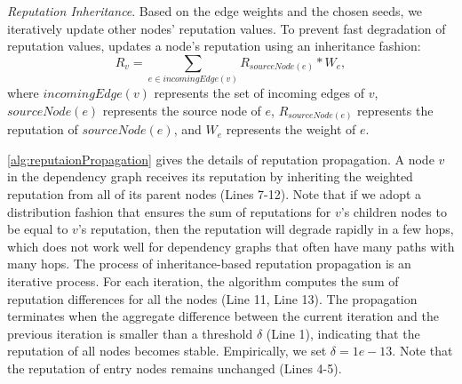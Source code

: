 


\emph{Reputation Inheritance}.
Based on the edge weights and the chosen seeds, we iteratively update other nodes' reputation values. 
To prevent fast degradation of reputation values, \tool updates a node's reputation using an inheritance fashion:  
\begin{equation}
    \label{eq:reputation}
     R_{v} =\sum_{e \in incomingEdge(v)} R_{sourceNode(e)}*W_e,
\end{equation}
where $incomingEdge(v)$ represents the set of incoming edges of $v$, $sourceNode(e)$ represents the source node of $e$, $R_{sourceNode(e)}$ represents the reputation of $sourceNode(e)$, and $W_e$ represents the weight of $e$.




\cref{alg:reputaionPropagation} gives the details of reputation propagation. 
A node $v$ in the dependency graph receives its reputation by inheriting the weighted reputation from all of its parent nodes (Lines 7-12).
Note that if we adopt a distribution fashion that ensures the sum of reputations for $v$'s children nodes to be equal to $v$'s reputation,
then the reputation will degrade rapidly in a few hops, which does not work well for dependency graphs that often have many paths with many hops.
%
The process of inheritance-based reputation propagation is an iterative process.
For each iteration, the algorithm computes the sum of reputation differences for all the nodes (Line 11, Line 13).
The propagation terminates when the aggregate difference between the current iteration and the previous iteration is smaller than a threshold $\delta$ (Line 1), indicating that the reputation of all nodes becomes stable.
Empirically, we set $\delta = 1e-13$.
Note that the reputation of entry nodes remains unchanged (Lines 4-5).


